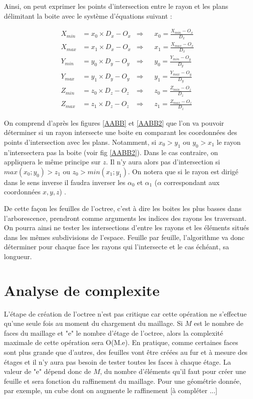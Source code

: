 Ainsi, on peut exprimer les points d'intersection entre le rayon et les plans délimitant la boite avec le système d'équations suivant :

\begin{align}
X_{min} &= x_0 \times D_x - O_x 	& \Rightarrow 	& &	 x_0 = \frac{X_{min} - O_x}{D_x} \\
X_{max} &= x_1 \times D_x - O_x 	& \Rightarrow 	& &	x_1 = \frac{X_{max} - O_x}{D_x} \\
Y_{min} &= y_0 \times D_y - O_y 	& \Rightarrow	& &	y_0 = \frac{Y_{min} - O_y}{D_y} \\
Y_{max} &= y_1 \times D_y - O_y 	& \Rightarrow	& &	y_1 = \frac{Y_{max} - O_y}{D_y} \\
Z_{min} &= z_0 \times D_z - O_z	& \Rightarrow 	& &	z_0 = \frac{Z_{min} - O_z}{D_z} \\
Z_{max} &= z_1 \times D_z - O_z 	& \Rightarrow 	& &	z_1 = \frac{Z_{max} - O_z}{D_z} 
\end{align}

On comprend d'après les figures \ref{AABB} et \ref{AABB2} que l'on va pouvoir déterminer si un rayon intersecte une boite en comparant les coordonnées des points d'intersection avec les plans. Notamment, si $x_0 > y_1$ ou $y_0 > x_1$ le rayon n'intersectera pas la boite (voir fig \ref{AABB2}). Dans le cas contraire, on appliquera le même principe sur $z$. Il n'y aura alors pas d'intersection si $max(x_0 ; y_0) > z_1$ ou $ z_0 > min(x_1 ; y_1)$. On notera que si le rayon est dirigé dans le sens inverse il faudra inverser les $\alpha_0$ et $\alpha_1$ ($\alpha$ correspondant aux coordonnées $x,y,z$) .

De cette façon les feuilles de l'\gls{octree}, c'est à dire les boites les plus basses dans l'arborescence, prendront comme arguments les indices des rayons les traversant. On pourra ainsi ne tester les intersections d'entre les rayons et les éléments situés dans les mêmes subdivisions de l'espace. Feuille par feuille, l'algorithme va donc déterminer pour chaque face les rayons qui l'intersecte et le cas échéant, sa longueur.




\section{Analyse de \gls{complexite}}

L'étape de création de l'\gls{octree} n'est pas critique car cette opération ne s'effectue qu'une seule fois au moment du chargement du maillage. Si $M$ est le nombre de faces du maillage et "e" le nombre d'étage de l'\gls{octree}, alors la complexité maximale de cette opération sera O(M.e). En pratique, comme certaines faces sont plus grande que d'autres, des feuilles vont être créées au fur et à mesure des étages et il n'y aura pas besoin de tester toutes les faces à chaque étage. La valeur de "e" dépend donc de $M$, du nombre d'éléments qu'il faut pour créer une feuille et sera fonction du raffinement du maillage. Pour une géométrie donnée, par exemple, un cube dont on augmente le raffinement [à compléter ...]

